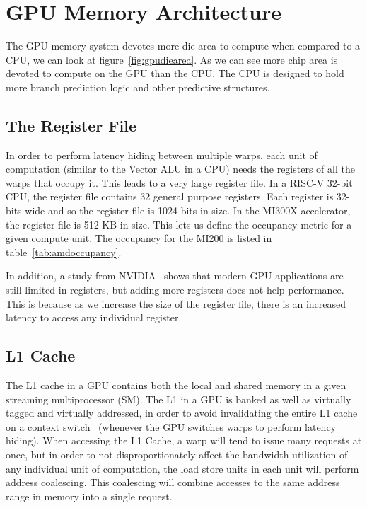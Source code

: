 \chapter{GPU Memory Architecture}

The GPU memory system devotes more die area to compute when compared to a CPU, we can look at figure~\ref{fig:gpudiearea}. As we can see more chip area is devoted to compute on the GPU than the CPU. The CPU is designed to hold more branch prediction logic and other predictive structures.

\section{The Register File}

In order to perform latency hiding between multiple warps, each unit of computation (similar to the Vector ALU in a CPU) needs the registers of all the warps that occupy it. This leads to a very large register file. In a RISC-V 32-bit CPU, the register file contains 32 general purpose registers. Each register is 32-bits wide and so the register file is 1024 bits in size. In the MI300X accelerator, the register file is 512 KB in size. This lets us define the occupancy metric for a given compute unit. The occupancy for the MI200 is listed in table~\ref{tab:amdoccupancy}.

In addition, a study from NVIDIA~\cite{nvidia:register-pressure} shows that modern GPU applications are still limited in registers, but adding more registers does not help performance. This is because as we increase the size of the register file, there is an increased latency to access any individual register.

\section{L1 Cache}

The L1 cache in a GPU contains both the local and shared memory in a given streaming multiprocessor (SM). The L1 in a GPU is banked as well as virtually tagged and virtually addressed, in order to avoid invalidating the entire L1 cache on a context switch~\cite{GPGPUbook} (whenever the GPU switches warps to perform latency hiding). When accessing the L1 Cache, a warp will tend to issue many requests at once, but in order to not disproportionately affect the bandwidth utilization of any individual unit of computation, the load store units in each unit will perform address coalescing. This coalescing will combine accesses to the same address range in memory into a single request.

